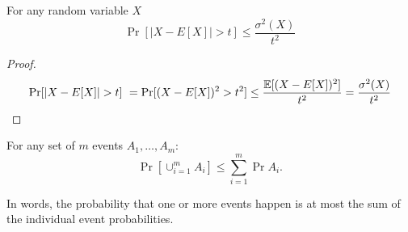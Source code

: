 \documentclass{article}
\begin{document}
\begin{fact}%
For any random variable $X$
\begin{equation}
\Pr[|X-E[X]| > t] \le \frac{\sigma^2(X)}{t^2}
\end{equation}
\end{fact}
\begin{proof}
\[
\Pr[|X-E[X]| > t]  = \Pr[(X-E[X])^2 > t^2] \le \frac{\E[(X-E[X])^2]}{t^2} = \frac{\sigma^2(X)}{t^2}
\]
\end{proof}

\begin{lemma}
For any set of $m$ events $A_1,\ldots,A_m$:
\[
\Pr[\cup_{i=1}^{m}A_i] \le \sum_{i=1}^{m}\Pr{A_i}.
\]
\end{lemma}
In words, the probability that one or more events happen is at most the sum of the 
individual event probabilities. 
\end{document}
